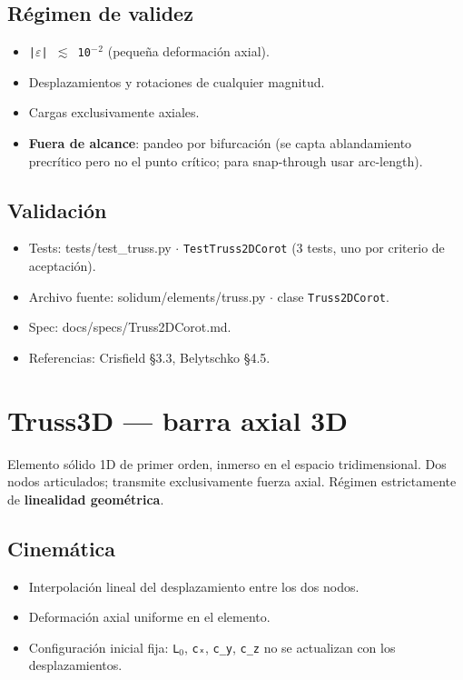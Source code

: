 \documentclass[11pt,letterpaper,oneside]{report}
\begin{document}
\subsection{Régimen de validez}
\begin{itemize}
  \item \texttt{|\ensuremath{\varepsilon}| \ensuremath{\lesssim} 10\ensuremath{^{-}}\ensuremath{^{2}}} (pequeña deformación axial).
  \item Desplazamientos y rotaciones de cualquier magnitud.
  \item Cargas exclusivamente axiales.
  \item \textbf{Fuera de alcance}: pandeo por bifurcación (se capta ablandamiento precrítico pero no el punto crítico; para snap-through usar arc-length).
\end{itemize}

\subsection{Validación}
\begin{itemize}
  \item Tests: tests/test\_truss.py \ensuremath{\cdot} \texttt{TestTruss2DCorot} (3 tests, uno por criterio de aceptación).
  \item Archivo fuente: solidum/elements/truss.py \ensuremath{\cdot} clase \texttt{Truss2DCorot}.
  \item Spec: docs/specs/Truss2DCorot.md.
  \item Referencias: Crisfield §3.3, Belytschko §4.5.
\end{itemize}


\section{Truss3D --- barra axial 3D}

Elemento sólido 1D de primer orden, inmerso en el espacio tridimensional. Dos nodos articulados; transmite exclusivamente fuerza axial. Régimen estrictamente de \textbf{linealidad geométrica}.

\subsection{Cinemática}
\begin{itemize}
  \item Interpolación lineal del desplazamiento entre los dos nodos.
  \item Deformación axial uniforme en el elemento.
  \item Configuración inicial fija: \texttt{L\ensuremath{_{0}}}, \texttt{cₓ}, \texttt{c\_y}, \texttt{c\_z} no se actualizan con los desplazamientos.
\end{itemize}
\end{document}
